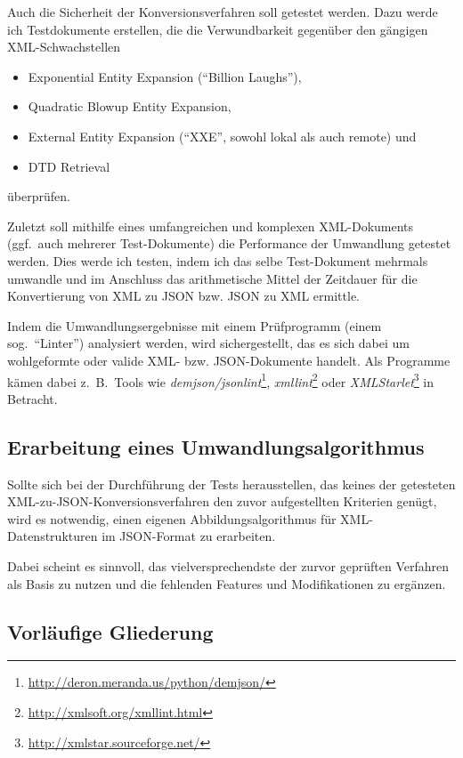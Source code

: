 \documentclass[conference]{template/IEEEtran}
\begin{document}
Auch die Sicherheit der Konversionsverfahren soll getestet werden. Dazu werde
ich Testdokumente erstellen, die die Verwundbarkeit gegenüber den gängigen
XML-Schwachstellen
\begin{itemize}
\item Exponential Entity Expansion (\enquote{Billion Laughs}),
\item Quadratic Blowup Entity Expansion,
\item External Entity Expansion (\enquote{XXE}, sowohl lokal als auch remote) und
\item DTD Retrieval
\end{itemize}
überprüfen.

Zuletzt soll mithilfe eines umfangreichen und komplexen XML-Dokuments
(ggf.~auch mehrerer Test-Dokumente) die Performance der Umwandlung getestet
werden. Dies werde ich testen, indem ich das selbe Test-Dokument mehrmals
umwandle und im Anschluss das arithmetische Mittel der Zeitdauer für die
Konvertierung von XML zu JSON bzw. JSON zu XML ermittle.

Indem die Umwandlungsergebnisse mit einem Prüfprogramm
(einem sog.\ \enquote{Linter}) analysiert werden, wird sichergestellt, das es
sich dabei um wohlgeformte oder valide XML- bzw. JSON-Dokumente handelt. Als
Programme kämen dabei z.~B.\ Tools wie
\emph{demjson/jsonlint}\footnote{\url{http://deron.meranda.us/python/demjson/}},
\emph{xmllint}\footnote{\url{http://xmlsoft.org/xmllint.html}} oder
\emph{XMLStarlet}\footnote{\url{http://xmlstar.sourceforge.net/}} in Betracht.

\subsection{Erarbeitung eines Umwandlungsalgorithmus}

Sollte sich bei der Durchführung der Tests herausstellen, das keines der
getesteten XML-zu-JSON-Konversionsverfahren den zuvor aufgestellten Kriterien
genügt, wird es notwendig, einen eigenen Abbildungsalgorithmus für
XML-Datenstrukturen im JSON-Format zu erarbeiten.

Dabei scheint es sinnvoll, das vielversprechendste der zurvor geprüften
Verfahren als Basis zu nutzen und die fehlenden Features und Modifikationen
zu ergänzen.

\subsection{Vorläufige Gliederung}
\end{document}
